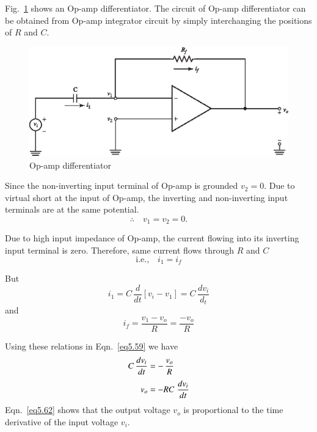 Fig.~\ref{fig5.20} shows an Op-amp differentiator. The circuit of Op-amp differentiator can be obtained from Op-amp integrator circuit by simply interchanging the positions of $R$ and $C$.
\begin{figure}[H]
\centering
\includegraphics{chap4/S3-EE-06-028.eps}
\caption{Op-amp differentiator}\label{fig5.20}
\end{figure}

Since the non-inverting input terminal of Op-amp is grounded $v_{2}=0$. Due to virtual short at the input of Op-amp, the inverting and non-inverting input terminals are at the same potential.
$$
\therefore\quad v_{1}=v_{2}=0.
$$

Due to high input impedance of Op-amp, the current flowing into its inverting input terminal is zero. Therefore, same current flows through $R$ and $C$
\begin{equation}
\text{i.e.,}\quad i_{1}=i_{f}\label{eq5.59}
\end{equation}

But
\begin{equation}
i_{1}=C\,\frac{d}{dt}[v_{i}-v_{1}]=C\,\frac{dv_{i}}{d_{t}}\label{eq5.60}
\end{equation}
and
\begin{equation}
i_{f}=\frac{v_{1}-v_{o}}{R}=\frac{-v_{o}}{R}\label{eq5.61}
\end{equation}

Using these relations in Eqn.~\eqref{eq5.59} we have
\begin{align}
C\,\dfrac{dv_{i}}{dt} &= -\,\frac{v_{o}}{R}\notag\\[3pt]
v_{o} &= -RC\;\frac{dv_{i}}{dt}\label{eq5.62}
\end{align}
Eqn.~\eqref{eq5.62} shows that the output voltage $v_{o}$ is proportional to the time derivative of the input voltage $v_{i}$.

